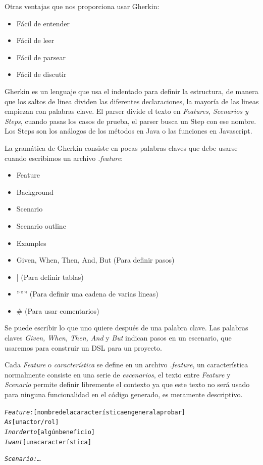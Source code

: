 Otras ventajas que nos proporciona usar Gherkin:
\begin{itemize}
    \item Fácil de entender
    \item Fácil de leer
    \item Fácil de parsear
    \item Fácil de discutir
\end{itemize}

Gherkin es un lenguaje que usa el indentado para definir la estructura, de manera
que los saltos de linea dividen las diferentes declaraciones, la mayoría de las
lineas empiezan con palabras clave. El parser divide el texto en {\it Features,
Scenarios y Steps}, cuando pasas los casos de prueba, el parser busca un Step con
ese nombre. Los Steps son los análogos de los métodos en Java o las funciones en
Javascript.

La gramática de Gherkin consiste en pocas palabras claves que debe usarse cuando
escribimos un archivo {\it .feature}:

\begin{itemize}
    \item Feature
    \item Background
    \item Scenario
    \item Scenario outline
    \item Examples
    \item Given, When, Then, And, But (Para definir pasos)
    \item | (Para definir tablas)
    \item '''''' (Para definir una cadena de varias lineas)
    \item \# (Para usar comentarios)
\end{itemize}

Se puede escribir lo que uno quiere después de una palabra clave. Las palabras
claves {\it Given, When, Then, And} y {\it But} indican pasos en un escenario, que
usaremos para construir un DSL para un proyecto.

Cada {\it Feature} o {\it característica} se define en un archivo {\it .feature},
un característica normalmente consiste en una serie de {\it escenarios}, el texto
entre {\it Feature} y {\it Scenario} permite definir libremente el contexto ya
que este texto no será usado para ninguna funcionalidad en el código generado,
es meramente descriptivo.

\vspace{0.5cm}
\begin{mdframed}
\begin{alltt}
\emph{Feature:} [nombre de la característica en general a probar]
  \emph{As} [un actor/rol]
  \emph{In order to} [algún beneficio]
  \emph{I want} [una característica]

  \emph{Scenario:} \ldots
\end{alltt}
\end{mdframed}
\vspace{0.5cm}

